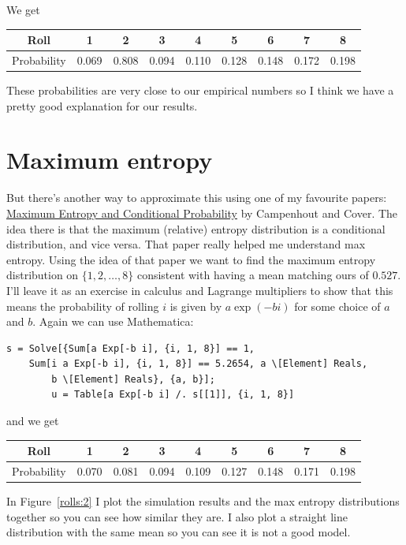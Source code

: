 \documentclass[12pt]{article}
\begin{document}
We get
\begin{center}
\begin{tabular}{|c|c|c|c|c|c|c|c|c|}
\hline
Roll & 1 & 2 & 3 & 4 & 5 & 6 & 7 & 8\\
\hline
Probability & 0.069 & 0.808 & 0.094 & 0.110 & 0.128 & 0.148 & 0.172 & 0.198\\
\hline
\end{tabular}
\end{center}
These probabilities are very close to our empirical numbers so I think we have a pretty good explanation for our results.

\section{Maximum entropy}
But there's another way to approximate this using one of my favourite papers:
\href{https://purl.stanford.edu/kr402kg0888}{Maximum Entropy and Conditional Probability} by Campenhout and Cover.
The idea there is that the maximum (relative) entropy distribution is a conditional distribution, and vice versa.
That paper really helped me understand max entropy.
Using the idea of that paper we want to find the maximum entropy distribution on $\{1,2,\ldots,8\}$ consistent with having a mean matching ours of $0.527$.
I'll leave it as an exercise in calculus and Lagrange multipliers to show that this means the probability of rolling $i$ is given by $a\exp(-bi)$ for some choice of $a$ and $b$.
Again we can use Mathematica:

\begin{verbatim}
s = Solve[{Sum[a Exp[-b i], {i, 1, 8}] == 1, 
    Sum[i a Exp[-b i], {i, 1, 8}] == 5.2654, a \[Element] Reals, 
        b \[Element] Reals}, {a, b}];
        u = Table[a Exp[-b i] /. s[[1]], {i, 1, 8}]
\end{verbatim}
and we get
\begin{center}
\begin{tabular}{|c|c|c|c|c|c|c|c|c|}
\hline
Roll & 1 & 2 & 3 & 4 & 5 & 6 & 7 & 8\\
\hline
Probability & 0.070 & 0.081 & 0.094 & 0.109 & 0.127 & 0.148 & 0.171 & 0.198\\
\hline
\end{tabular}
\end{center}

In Figure~\ref{rolls:2} I plot the simulation results and the max entropy distributions together so you can see how similar they are.
I also plot a straight line distribution with the same mean so you can see it is not a good model.
\end{document}
